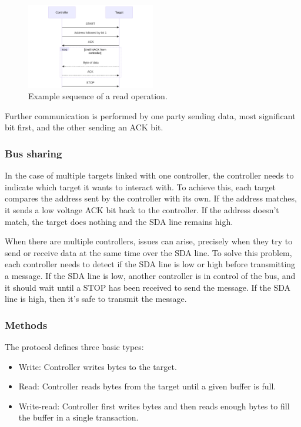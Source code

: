 \begin{figure}[h]
    \centering
    \includegraphics[width=0.5\textwidth]{figures/read_example.png}
    \caption{Example sequence of a read operation.}
    \label{fig:read_example}
\end{figure}

Further communication is performed by one party sending data, most significant bit first, and the other sending an \gls{ACK} bit.

\subsubsection{Bus sharing}

In the case of multiple targets linked with one controller, the controller needs to indicate which target it wants to interact with. To achieve this, each target compares the address sent by the controller with its own. If the address matches, it sends a low voltage \gls{ACK} bit back to the controller. If the address doesn't match, the target does nothing and the \gls{SDA} line remains high.

When there are multiple controllers, issues can arise, precisely when they try to send or receive data at the same time over the \gls{SDA} line. To solve this problem, each controller needs to detect if the \gls{SDA} line is low or high before transmitting a message. If the \gls{SDA} line is low, another controller is in control of the bus, and it should wait until a STOP has been received to send the message. If the \gls{SDA} line is high, then it's safe to transmit the message.

\subsubsection{Methods}
\label{sec:methods}

The protocol defines three basic types:
\begin{itemize}
    \item Write: Controller writes bytes to the target.
    \item Read: Controller reads bytes from the target until a given buffer is full.
    \item Write-read: Controller first writes bytes and then reads enough bytes to fill the buffer in a single transaction.
\end{itemize}

